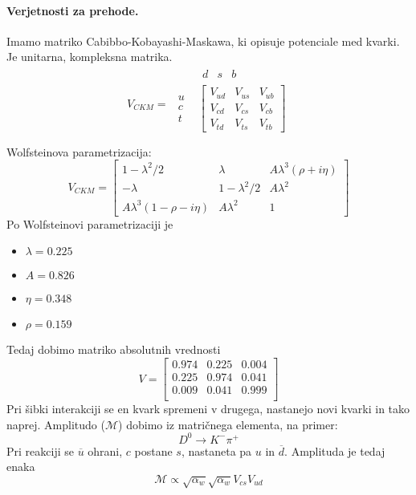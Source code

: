 \documentclass[a4paper]{article}
\newcommand{\anti}[1]{\overline{#1}}
\begin{document}
\paragraph{Verjetnosti za prehode.} Imamo matriko Cabibbo-Kobayashi-Maskawa, ki opisuje potenciale med kvarki. Je unitarna, kompleksna matrika.
$$V_{CKM} = \begin{matrix}
    & \begin{matrix} 
    d & s & b
    \end{matrix} \\
    \begin{matrix}
        u \\ c \\ t
    \end{matrix} &
    \begin{bmatrix}
        V_{ud} & V_{us} & V_{ub} \\
        V_{cd} & V_{cs} & V_{cb} \\
        V_{td} & V_{ts} & V_{tb}
    \end{bmatrix} \\
    & \\
\end{matrix}$$
Wolfsteinova parametrizacija:
$$V_{CKM} = \begin{bmatrix}
    1 - \lambda^2/2 & \lambda & A\lambda^3(\rho + i\eta) \\
    -\lambda & 1 - \lambda^2/2 & A\lambda^2 \\
    A\lambda^3(1 - \rho - i\eta) & A \lambda^2 & 1
\end{bmatrix}$$
Po Wolfsteinovi parametrizaciji je
\begin{itemize}
    \item $\lambda = 0.225$
    \item $A = 0.826$
    \item $\eta = 0.348$
    \item $\rho = 0.159$
\end{itemize}
Tedaj dobimo matriko absolutnih vrednosti
$$V = \begin{bmatrix}
    0.974 & 0.225 & 0.004 \\
    0.225 & 0.974 & 0.041 \\
    0.009 & 0.041 & 0.999 \\
\end{bmatrix}$$
Pri šibki interakciji se en kvark spremeni v drugega, nastanejo novi kvarki in tako naprej. Amplitudo ($\mathcal{M}$) dobimo iz matričnega elementa, na primer:
$$D^0 \to K^- \pi^+$$
Pri reakciji se $\anti{u}$ ohrani, $c$ postane $s$, nastaneta pa $u$ in $\anti{d}$. Amplituda je tedaj enaka
$$\mathcal{M} \propto \sqrt{\alpha_w}\sqrt{\alpha_w}V_{cs}V_{ud}$$
\end{document}
